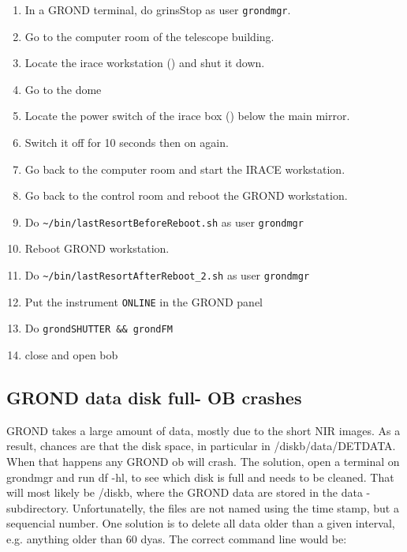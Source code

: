 \documentclass[11pt,fleqn,a4paper]{book}
\def\home{\textasciitilde{}}
\begin{document}
\label{proc:iracerestart}
\begin{enumerate}
  \item In a GROND terminal, do \gls{grinsStop} as user \texttt{grondmgr}.
  \item Go to the \gls{computer room} of the telescope building.
  \item Locate the \gls{irace} workstation () and shut it down.
  \item Go to the \gls{dome} 
  \item Locate the power switch of the \gls{irace} box () below the \gls{main mirror}.
  \item Switch it off for 10 seconds then on again.
  \item Go back to the \gls{computer room} and start the IRACE workstation.
  \item Go back to the \gls{control room} and reboot the GROND workstation.
  \item Do \texttt{\home/bin/lastResortBeforeReboot.sh} as user \texttt{grondmgr}
  \item Reboot GROND workstation.
  \item Do \texttt{\home/bin/lastResortAfterReboot\_2.sh} as user \texttt{grondmgr}
  \item Put the instrument \texttt{ONLINE} in the GROND panel
  \item Do \texttt{grondSHUTTER \&\& grondFM}
  \item close and open bob
\end{enumerate} 



\subsection{GROND data disk full- OB crashes}

GROND takes a large amount of data, mostly due to the short NIR images. As a result, chances are that the disk space, in particular in /diskb/data/DETDATA. When that happens any GROND \gls{ob} will crash. The solution, open a terminal on grondmgr and run df -hl, to see which disk is full and needs to be cleaned.  That will most likely be /diskb, where the GROND data are stored in the data -subdirectory. Unfortunatelly, the files are not named using the time stamp, but a sequencial number. One solution is to delete all data older than  a given interval, e.g. anything older than 60 dyas. The correct command line would be: 
\end{document}
